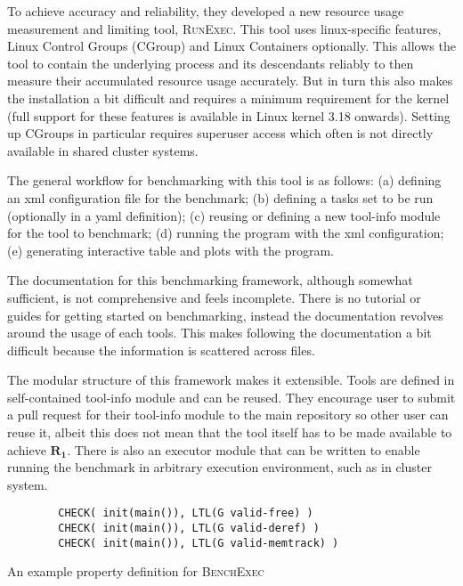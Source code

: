To achieve accuracy and reliability, they developed a new resource usage measurement and limiting tool, \textsc{RunExec}.
This tool uses linux-specific features, Linux Control Groups (CGroup) and Linux Containers optionally.
This allows the tool to contain the underlying process and its descendants reliably to then measure their accumulated resource usage accurately.
But in turn this also makes the installation a bit difficult and requires a minimum requirement for the kernel (full support for these features is available in Linux kernel 3.18 onwards).
Setting up CGroups in particular requires superuser access which often is not directly available in shared cluster systems.

The general workflow for benchmarking with this tool is as follows:
(a) defining an xml configuration file for the benchmark;
(b) defining a tasks set to be run (optionally in a yaml definition);
(c) reusing or defining a new tool-info module for the tool to benchmark;
(d) running the  program with the xml configuration;
(e) generating interactive table and plots with the  program.

The documentation for this benchmarking framework, although somewhat sufficient, is not comprehensive and feels incomplete.
There is no tutorial or guides for getting started on benchmarking, instead the documentation revolves around the usage of each tools.
This makes following the documentation a bit difficult because the information is scattered across files.

The modular structure of this framework makes it extensible.
Tools are defined in self-contained tool-info module and can be reused.
They encourage user to submit a pull request for their tool-info module to the main repository so other user can reuse it, albeit this does not mean that the tool itself has to be made available to achieve $\bm{R_1}$.
There is also an executor module that can be written to enable running the benchmark in arbitrary execution environment, such as in cluster system.

\begin{listing}
	\begin{verbatim}
		CHECK( init(main()), LTL(G valid-free) )
		CHECK( init(main()), LTL(G valid-deref) )
		CHECK( init(main()), LTL(G valid-memtrack) )
	\end{verbatim}
	\caption{An example property definition for \textsc{BenchExec}}
	\label{lst:benchexec.property}
\end{listing}

